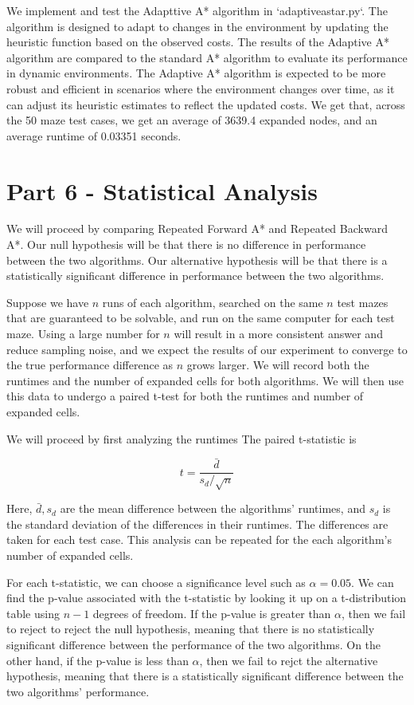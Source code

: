 \documentclass[12pt]{article}
\begin{document}
We implement and test the Adapttive A* algorithm in `adaptiveastar.py`.
The algorithm is designed to adapt to changes in the environment by updating the heuristic function based on the observed costs.
The results of the Adaptive A* algorithm are compared to the standard A* algorithm to evaluate its performance in dynamic environments.
The Adaptive A* algorithm is expected to be more robust and efficient in scenarios where the environment changes over time, as it can adjust its heuristic estimates to reflect the updated costs.
We get that,
across the 50 maze test cases,
we get an average of 3639.4 expanded nodes,
and an average runtime of 0.03351 seconds.


\section{Part 6 - Statistical Analysis}

We will proceed by comparing Repeated Forward A* and Repeated Backward A*.
Our null hypothesis will be that there is no difference in performance between the two algorithms.
Our alternative hypothesis will be that there is a statistically significant difference in performance between the two algorithms.

Suppose we have $n$ runs of each algorithm,
searched on the same $n$ test mazes that are guaranteed to be solvable,
and run on the same computer for each test maze.
Using a large number for $n$ will result in a more consistent answer and reduce sampling noise,
and we expect the results of our experiment to converge to the true performance difference as $n$ grows larger.
We will record both the runtimes and the number of expanded cells for both algorithms.
We will then use this data to undergo a paired t-test for both the runtimes and number of expanded cells.

We will proceed by first analyzing the runtimes
The paired t-statistic is

$$
t = \frac{\bar{d}}{s_d/\sqrt{n}}
$$

Here, 
$\bar{d}, s_d$ are the mean difference between the algorithms' runtimes, 
and $s_d$ is the standard deviation of the differences in their runtimes.
The differences are taken for each test case.
This analysis can be repeated for the each algorithm's number of expanded cells.

For each t-statistic,
we can choose a significance level such as 
$\alpha = 0.05$.
We can find the p-value associated with the t-statistic by looking it up on a t-distribution table using 
$n-1$ degrees of freedom.
If the p-value is greater than $\alpha$,
then we fail to reject to reject the null hypothesis,
meaning that there is no statistically significant difference between the performance of the two algorithms.
On the other hand,
if the p-value is less than $\alpha$,
then we fail to rejct the alternative hypothesis,
meaning that there is a statistically significant difference between the two algorithms' performance.
\end{document}
